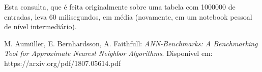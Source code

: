 \documentclass[a4paper,12pt,titlepage]{scrartcl}
\begin{document}
Esta consulta, que é feita originalmente sobre uma tabela com 1000000 de entradas, leva 60 milisegundos, em média (novamente, em um notebook pessoal de nível intermediário). 

\begin{thebibliography}{99}

 M. Aum\"{u}ller, E. Bernhardsson, A. Faithfull: \emph{ANN-Benchmarks: A Benchmarking Tool for Approximate Nearest Neighbor Algorithms}. Disponível em: https://arxiv.org/pdf/1807.05614.pdf


\end{thebibliography}
\end{document}
